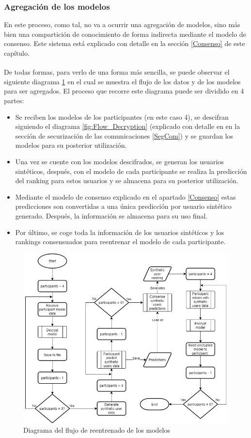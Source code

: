 \subsubsection{Agregación de los modelos}
En este proceso, como tal, no va a ocurrir una agregación de modelos, sino más bien una compartición de conocimiento de forma indirecta mediante el modelo de consenso. Este sistema está explicado con detalle en la sección \ref{Consenso} de este capítulo.
\\ \\
De todas formas, para verlo de una forma más sencilla, se puede observar el siguiente diagrama \ref{fig:Flow_Agregation} en el cual se muestra el flujo de los datos y de los modelos para ser agregados. El proceso que recorre este diagrama puede ser dividido en 4 partes:
\begin{itemize}
    \item Se reciben los modelos de los participantes (en este caso 4), se descifran siguiendo el diagrama \ref{fig:Flow_Decryption} (explicado con detalle en en la sección de securización de las comunicaciones \ref{SegCom}) y se guardan los modelos para su posterior utilización.
    \item Una vez se cuente con los modelos descifrados, se generan los usuarios sintéticos, después, con el modelo de cada participante se realiza la predicción del ranking para estos usuarios y se almacena para su posterior utilización. 
    \item Mediante el modelo de consenso explicado en el apartado \ref{Consenso} estas predicciones son convertidas a una única predicción por usuario sintético generado. Después, la información se almacena para su uso final.
    \item Por último, se coge toda la información de los usuarios sintéticos y los rankings consensuados para reentrenar el modelo de cada participante. 
\end{itemize}
\begin{figure}[H]
    \centering
    \includegraphics[width=\textwidth]{Figuras/flowchart_agregation.png}    
    \caption{Diagrama del flujo de reentrenado de los modelos} 
    \label{fig:Flow_Agregation}
\end{figure}
\newpage
